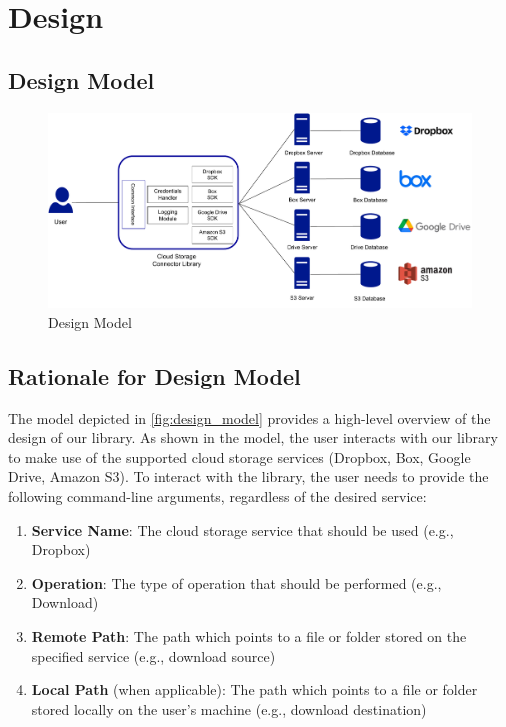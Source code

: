 \chapter{Design}\label{ch:design}

\section{Design Model}

\begin{figure} [h]
    \centering
    \includegraphics[scale=0.50]{images/design_diagram}
    \caption{\label{fig:design_model}Design Model}
\end{figure}

\section{Rationale for Design Model}
The model depicted in \autoref{fig:design_model} provides a high-level overview of the design of our library. As shown in the model, the user interacts with our library to make use of the supported cloud storage services (Dropbox, Box, Google Drive, Amazon S3). To interact with the library, the user needs to provide the following command-line arguments, regardless of the desired service:

\begin{enumerate}
    \item \textbf{Service Name}: The cloud storage service that should be used (e.g., Dropbox)

    \item \textbf{Operation}: The type of operation that should be performed (e.g., Download)

    \item \textbf{Remote Path}: The path which points to a file or folder stored on the specified service (e.g., download source)

    \item \textbf{Local Path} (when applicable): The path which points to a file or folder stored locally on the user's machine (e.g., download destination)
\end{enumerate}

